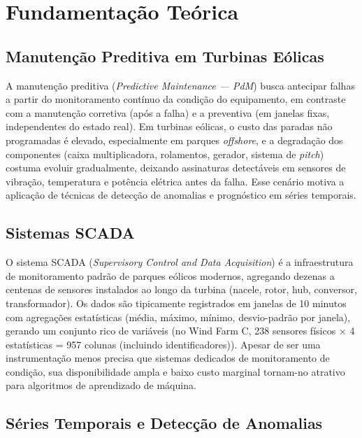 \documentclass[12pt]{article}
\begin{document}
\section{Fundamentação Teórica}

\subsection{Manutenção Preditiva em Turbinas Eólicas}

A manutenção preditiva (\textit{Predictive Maintenance --- PdM}) busca antecipar falhas a partir do monitoramento contínuo da condição do equipamento, em contraste com a manutenção corretiva (após a falha) e a preventiva (em janelas fixas, independentes do estado real). Em turbinas eólicas, o custo das paradas não programadas é elevado, especialmente em parques \textit{offshore}, e a degradação dos componentes (caixa multiplicadora, rolamentos, gerador, sistema de \textit{pitch}) costuma evoluir gradualmente, deixando assinaturas detectáveis em sensores de vibração, temperatura e potência elétrica antes da falha. Esse cenário motiva a aplicação de técnicas de detecção de anomalias e prognóstico em séries temporais.

\subsection{Sistemas SCADA}

O sistema SCADA (\textit{Supervisory Control and Data Acquisition}) é a infraestrutura de monitoramento padrão de parques eólicos modernos, agregando dezenas a centenas de sensores instalados ao longo da turbina (nacele, rotor, hub, conversor, transformador). Os dados são tipicamente registrados em janelas de 10 minutos com agregações estatísticas (média, máximo, mínimo, desvio-padrão por janela), gerando um conjunto rico de variáveis (no Wind Farm C, 238 sensores físicos $\times$ 4 estatísticas = 957 colunas (incluindo identificadores)). Apesar de ser uma instrumentação menos precisa que sistemas dedicados de monitoramento de condição, sua disponibilidade ampla e baixo custo marginal tornam-no atrativo para algoritmos de aprendizado de máquina.

\subsection{Séries Temporais e Detecção de Anomalias}
\end{document}
